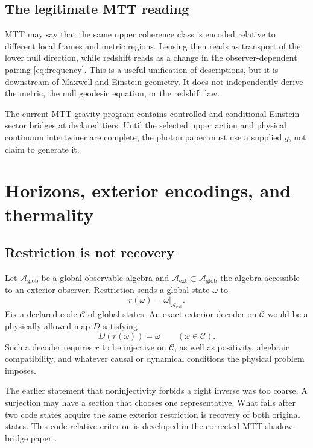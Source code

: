 \documentclass[11pt,a4paper]{article}
\numberwithin{equation}{section}
\theoremstyle{definition}
\theoremstyle{remark}
\newcommand{\cA}{\mathcal A}
\newcommand{\cC}{\mathcal C}
\begin{document}
\subsection{The legitimate MTT reading}

MTT may say that the same upper coherence class is encoded relative to
different local frames and metric regions.  Lensing then reads as
transport of the lower null direction, while redshift reads as a change
in the observer-dependent pairing \eqref{eq:frequency}.  This is a useful
unification of descriptions, but it is downstream of Maxwell and
Einstein geometry.  It does not independently derive the metric, the
null geodesic equation, or the redshift law.

The current MTT gravity program contains controlled and conditional
Einstein-sector bridges at declared tiers.  Until the selected upper
action and physical continuum intertwiner are complete, the photon paper
must use a supplied \(g\), not claim to generate it.

\section{Horizons, exterior encodings, and thermality}

\subsection{Restriction is not recovery}

Let \(\cA_{\mathrm{glob}}\) be a global observable algebra and
\(\cA_{\mathrm{ext}}\subset\cA_{\mathrm{glob}}\) the algebra accessible
to an exterior observer.  Restriction sends a global state \(\omega\) to
\[
r(\omega)=\omega|_{\cA_{\mathrm{ext}}}.
\]
Fix a declared code \(\cC\) of global states.  An exact exterior decoder
on \(\cC\) would be a physically allowed map \(D\) satisfying
\[
D(r(\omega))=\omega
\qquad(\omega\in\cC).
\label{eq:decoder}
\]
Such a decoder requires \(r\) to be injective on \(\cC\), as well as
positivity, algebraic compatibility, and whatever causal or dynamical
conditions the physical problem imposes.

The earlier statement that noninjectivity forbids a right inverse was too
coarse.  A surjection may have a section that chooses one representative.
What fails after two code states acquire the same exterior restriction is
recovery of both original states.  This code-relative criterion is
developed in the corrected MTT shadow-bridge paper
\cite{NeroShadow2026}.
\end{document}
